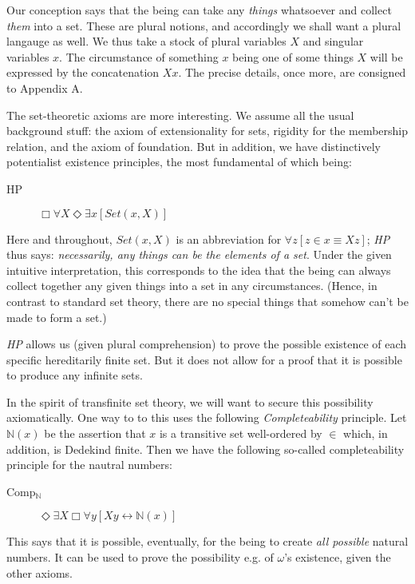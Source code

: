 \documentclass{article}
\begin{document}
Our conception says that the being can take any \emph{things} whatsoever and collect 
\emph{them} into a set. These are plural notions, and accordingly we shall want a plural 
langauge as well. We thus take a stock of plural variables $X$ and singular variables $x$.
The circumstance of something $x$ being one of some things $X$ will be expressed by 
the concatenation $Xx$. The precise details, once more,  are consigned to Appendix A. 

The set-theoretic axioms are more interesting. We assume all the usual 
background stuff: the axiom of extensionality for sets, rigidity for the 
membership relation, and the axiom of foundation. But in addition, we have 
distinctively potentialist existence principles, the most fundamental of which 
being:

\begin{description} 
    \item[HP] $\Box \forall X \Diamond \exists x [Set(x, X)]$
\end{description}
Here and throughout, $Set(x, X)$ is an abbreviation for 
$\forall z[z \in x \equiv Xz]$; \emph{ HP} thus says: \emph{necessarily, any 
things can be the elements of a set}. Under the given 
intuitive interpretation, this corresponds to the idea that the being 
can always collect together any given things into a set in any circumstances.  
(Hence, in contrast to standard set theory, there are no 
special things that somehow can't be made to form a set.)

\emph{ HP} allows us (given plural comprehension) to prove the possible existence 
of each specific hereditarily finite set. But it does not allow for a proof that 
it is possible to produce any infinite sets. 

In the spirit of transfinite 
set theory, we will want to secure this possibility axiomatically. 
One way to to this uses the following \emph{ Completeability} principle. 
Let $\mathbb{N}(x)$ be the assertion that $x$ is a transitive set well-ordered 
by $\in$ which, in addition, is Dedekind finite. Then we have the following 
so-called completeability principle for the nautral numbers:
\begin{description}
    \item[Comp$_\mathbb{N}$]
    $\Diamond \exists X \Box \forall y[ Xy \leftrightarrow \mathbb{N}(x)]$
\end{description}
This says that it is possible, eventually, for the being to create \emph{all possible}
natural numbers. It can be used to prove the possibility 
e.g. of $\omega$'s existence, given the other axioms.
\end{document}
